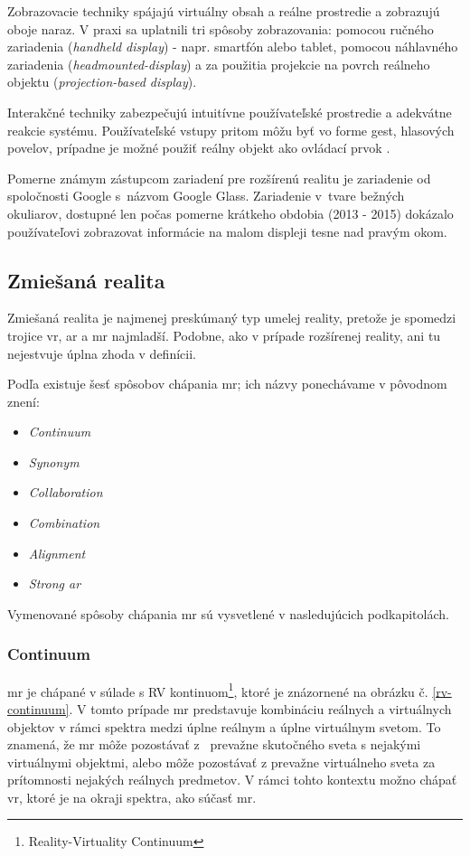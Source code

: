 Zobrazovacie techniky spájajú virtuálny obsah a reálne prostredie a zobrazujú oboje naraz. V praxi sa uplatnili tri spôsoby zobrazovania: pomocou ručného zariadenia 
(\emph{handheld display}) - napr. smartfón alebo tablet, pomocou náhlavného zariadenia (\emph{headmounted-display}) a za použitia projekcie na povrch reálneho objektu 
(\emph{projection-based display}).

Interakčné techniky zabezpečujú intuitívne používateľské prostredie a adekvátne reakcie systému. Používateľské vstupy pritom môžu byť vo forme gest, hlasových povelov,
prípadne je možné použiť reálny objekt ako ovládací prvok \cite{chenRenaissanceAugmentedReality2022}.

\newpage Pomerne známym zástupcom zariadení pre rozšírenú realitu je zariadenie od spoločnosti Google s~názvom Google Glass. Zariadenie v~tvare bežných 
okuliarov, dostupné len počas pomerne krátkeho obdobia (2013 - 2015) \cite{brighamRealityCheckBasics2017} dokázalo používateľovi zobrazovat informácie na malom displeji tesne
nad pravým okom. 

\subsection{Zmiešaná realita}
Zmiešaná realita je najmenej preskúmaný typ umelej reality, pretože je spomedzi trojice \acrshort{vr}, \acrshort{ar} a \acrshort{mr} najmladší. Podobne, ako v prípade
rozšírenej reality, ani tu nejestvuje úplna zhoda v definícii. 

Podľa \cite{speicherWhatMixedReality2019a} existuje šesť spôsobov chápania \acrshort{mr}; ich názvy ponechávame v pôvodnom znení:
\begin{itemize}
  \item \emph{Continuum}
  \item \emph{Synonym}
  \item \emph{Collaboration}
  \item \emph{Combination}
  \item \emph{Alignment}
  \item \emph{Strong \acrshort{ar}}
\end{itemize}

\noindent Vymenované spôsoby chápania \acrshort{mr} sú vysvetlené v nasledujúcich podkapitolách.

\subsubsection{Continuum}
\acrshort{mr} je chápané v súlade s RV kontinuom\footnote{Reality-Virtuality Continuum}, ktoré je znázornené na obrázku č. \ref{rv-continuum}. V tomto prípade \acrshort{mr}
predstavuje kombináciu reálnych a virtuálnych objektov v rámci spektra medzi úplne reálnym a úplne virtuálnym svetom. To znamená, že \acrshort{mr} môže pozostávať z~
prevažne skutočného sveta s nejakými virtuálnymi objektmi, alebo môže pozostávať z prevažne virtuálneho sveta za prítomnosti nejakých reálnych predmetov. V rámci tohto
kontextu možno chápať \acrshort{vr}, ktoré je na okraji spektra, ako súčasť \acrshort{mr}.

